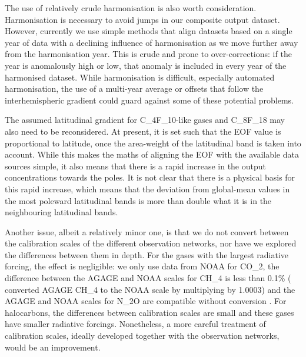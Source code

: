 The use of relatively crude harmonisation is also worth consideration.
Harmonisation is necessary to avoid jumps in our composite output dataset.
However, currently we use simple methods that align datasets based on a single year of data
with a declining influence of harmonisation as we move further away from the harmonisation year.
This is crude and prone to over-corrections: if the year is anomalously high or low,
that anomaly is included in every year of the harmonised dataset.
While harmonisation is difficult, especially automated harmonisation,
the use of a multi-year average or offsets that follow the interhemispheric gradient
could guard against some of these potential problems.

The assumed latitudinal gradient for C_4F_10-like gases and C_8F_18 may also need to be reconsidered.
At present, it is set such that the EOF value is proportional to latitude,
once the area-weight of the latitudinal band is taken into account.
While this makes the maths of aligning the EOF with the available data sources simple,
it also means that there is a rapid increase in the output concentrations towards the poles.
It is not clear that there is a physical basis for this rapid increase,
which means that the deviation from global-mean values in the most poleward latitudinal bands
is more than double what it is in the neighbouring latitudinal bands.

Another issue, albeit a relatively minor one,
is that we do not convert between the calibration scales of the different observation networks,
nor have we explored the differences between them in depth.
For the gases with the largest radiative forcing, the effect is negligible:
we only use data from NOAA for CO_2,
the difference between the AGAGE and NOAA scales for CH_4 is less than 0.1\%
(\citealp{meinshausen_historical-ghgs_2017} converted AGAGE CH_4 to the NOAA scale by multiplying by 1.0003)
and the AGAGE and NOAA scales for N_2O are compatible without conversion
\citep{meinshausen_historical-ghgs_2017}.
For halocarbons, the differences between calibration scales are small
and these gases have smaller radiative forcings.
Nonetheless, a more careful treatment of calibration scales,
ideally developed together with the observation networks,
would be an improvement.

